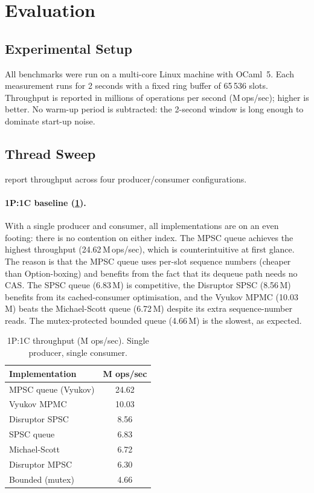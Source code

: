 \documentclass[11pt,a4paper]{article}
\begin{document}
\section{Evaluation}
\label{sec:evaluation}

\subsection{Experimental Setup}

All benchmarks were run on a multi-core Linux machine with OCaml~5. Each measurement
runs for 2 seconds with a fixed ring buffer of 65\,536 slots. Throughput is reported
in millions of operations per second (M\,ops/sec); higher is better. No warm-up
period is subtracted: the 2-second window is long enough to dominate start-up noise.

\subsection{Thread Sweep }
\label{subsec:thread-sweep}

 report throughput across four
producer/consumer configurations.

\paragraph{1P:1C baseline (\cref{tab:1p1c}).}
With a single producer and consumer, all implementations are on an even footing:
there is no contention on either index. The MPSC queue achieves the highest
throughput (24.62\,M\,ops/sec), which is counterintuitive at first glance. The
reason is that the MPSC queue uses per-slot sequence numbers (cheaper than
Option-boxing) and benefits from the fact that its dequeue path needs no CAS. The
SPSC queue (6.83\,M) is competitive, the Disruptor SPSC (8.56\,M) benefits from its
cached-consumer optimisation, and the Vyukov MPMC (10.03\,M) beats the Michael-Scott
queue (6.72\,M) despite its extra sequence-number reads. The mutex-protected bounded
queue (4.66\,M) is the slowest, as expected.

\begin{table}[H]
\centering
\caption{1P:1C throughput (M ops/sec). Single producer, single consumer.}
\label{tab:1p1c}
\begin{tabular}{@{}lc@{}}
\toprule
Implementation & M ops/sec \\
\midrule
MPSC queue (Vyukov)         & 24.62 \\
Vyukov MPMC                 & 10.03 \\
Disruptor SPSC              & 8.56  \\
SPSC queue                  & 6.83  \\
Michael-Scott               & 6.72  \\
Disruptor MPSC              & 6.30  \\
Bounded (mutex)             & 4.66  \\
\bottomrule
\end{tabular}
\end{table}
\end{document}
